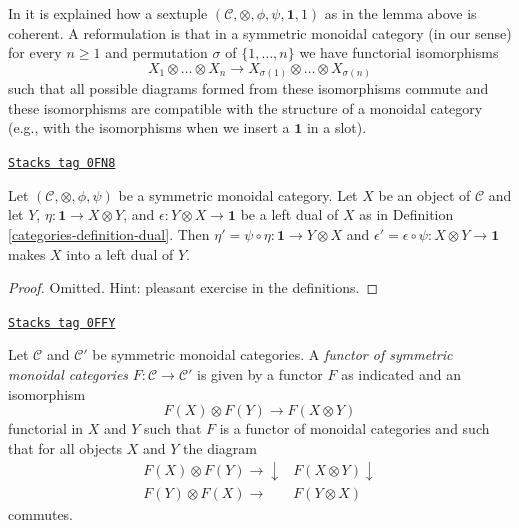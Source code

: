 In \cite[Theorem 5.1]{associativity} it is explained how a sextuple
$(\mathcal{C}, \otimes, \phi, \psi, \mathbf{1}, 1)$ as in the lemma above
is coherent. A reformulation is that in a symmetric monoidal category
(in our sense) for every $n \geq 1$ and permutation $\sigma$
of $\{1, \ldots, n\}$ we have functorial isomorphisms
$$
X_1 \otimes \ldots \otimes X_n
\to
X_{\sigma(1)} \otimes \ldots \otimes X_{\sigma(n)}
$$
such that all possible diagrams formed from these isomorphisms
commute and these isomorphisms are compatible with the structure
of a monoidal category (e.g., with the isomorphisms when we insert
a $\mathbf{1}$ in a slot).

\begin{lemma}
\label{categories-lemma-dual-symmetric}
\href{https://stacks.math.columbia.edu/tag/0FN8}{\texttt{Stacks tag 0FN8}}

Let $(\mathcal{C}, \otimes, \phi, \psi)$ be a symmetric monoidal category.
Let $X$ be an object of $\mathcal{C}$ and let $Y$,
$\eta : \mathbf{1} \to X \otimes Y$, and
$\epsilon : Y \otimes X \to \mathbf{1}$
be a left dual of $X$ as in Definition \ref{categories-definition-dual}.
Then $\eta' = \psi \circ \eta : \mathbf{1} \to Y \otimes X$
and $\epsilon' = \epsilon \circ \psi : X \otimes Y \to \mathbf{1}$
makes $X$ into a left dual of $Y$.
\end{lemma}

\begin{proof}
Omitted. Hint: pleasant exercise in the definitions.
\end{proof}

\begin{definition}
\label{categories-definition-functor-symmetric-monoidal-categories}
\href{https://stacks.math.columbia.edu/tag/0FFY}{\texttt{Stacks tag 0FFY}}

Let $\mathcal{C}$ and $\mathcal{C}'$ be symmetric monoidal categories.
A {\it functor of symmetric monoidal categories}
$F : \mathcal{C} \to \mathcal{C}'$
is given by a functor $F$ as indicated and an isomorphism
$$
F(X) \otimes F(Y) \to F(X \otimes Y)
$$
functorial in $X$ and $Y$
such that $F$ is a functor of monoidal categories and such that
for all objects $X$ and $Y$ the diagram
$$
\begin{array}{cc}F(X) \otimes F(Y) \longrightarrow\downarrow & F(X \otimes Y) \downarrow \\ F(Y) \otimes F(X) \longrightarrow & F(Y \otimes X)\end{array}
$$
commutes.
\end{definition}

